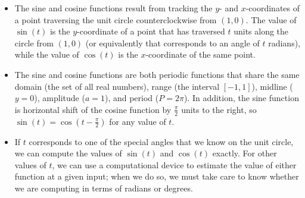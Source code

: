 \documentclass[nooutcomes]{ximera}
\begin{document}

\begin{summary}
\begin{itemize}[label=\textbullet]
\item
The sine and cosine functions result from tracking the \(y\)- and \(x\)-coordinates of a point traversing the unit circle counterclockwise from \((1,0)\).  The value of \(\sin(t)\) is the \(y\)-coordinate of a point that has traversed \(t\) units along the circle from \((1,0)\) (or equivalently that corresponds to an angle of \(t\) radians), while the value of \(\cos(t)\) is the \(x\)-coordinate of the same point.%
\item
The sine and cosine functions are both periodic functions that share the same domain (the set of all real numbers), range (the interval \([-1,1]\)), midline (\(y = 0\)), amplitude (\(a = 1\)), and period (\(P = 2\pi\)).  In addition, the sine function is horizontal shift of the cosine function by \(\frac{\pi}{2}\) units to the right, so \(\sin(t) = \cos(t-\frac{\pi}{2})\) for any value of \(t\).%
\item
If \(t\) corresponds to one of the special angles that we know on the unit circle, we can compute the values of \(\sin(t)\) and \(\cos(t)\) exactly.  For other values of \(t\), we can use a computational device to estimate the value of either function at a given input; when we do so, we must take care to know whether we are computing in terms of radians or degrees.%
\end{itemize}
\end{summary}
\end{document}
